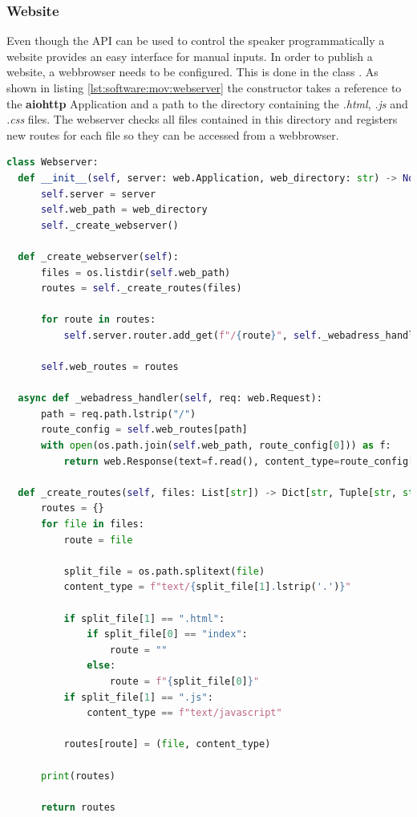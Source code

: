 \subsubsection*{Website}

Even though the API can be used to control the speaker programmatically a website provides an easy interface for manual inputs.\p
%
In order to publish a website,  a webbrowser needs to be configured. This is done in the class . As shown in listing \ref{lst:software:mov:webserver} the constructor takes a reference to the \textbf{aiohttp} Application and a path to the directory containing the \textit{.html}, \textit{.js} and \textit{.css} files. The webserver checks all files contained in this directory and registers new routes for each file so they can be accessed from a webbrowser.\p
%
\begin{mdframed}
\begin{lstlisting}[language=Python, caption=Minimal python webserver, label=lst:software:mov:webserver]
class Webserver:
  def __init__(self, server: web.Application, web_directory: str) -> None:
      self.server = server
      self.web_path = web_directory
      self._create_webserver()

  def _create_webserver(self):
      files = os.listdir(self.web_path)
      routes = self._create_routes(files)

      for route in routes:
          self.server.router.add_get(f"/{route}", self._webadress_handler)

      self.web_routes = routes

  async def _webadress_handler(self, req: web.Request):
      path = req.path.lstrip("/")
      route_config = self.web_routes[path]
      with open(os.path.join(self.web_path, route_config[0])) as f:
          return web.Response(text=f.read(), content_type=route_config[1])

  def _create_routes(self, files: List[str]) -> Dict[str, Tuple[str, str]]:
      routes = {}
      for file in files:
          route = file

          split_file = os.path.splitext(file)
          content_type = f"text/{split_file[1].lstrip('.')}"

          if split_file[1] == ".html":
              if split_file[0] == "index":
                  route = ""
              else:
                  route = f"{split_file[0]}"
          if split_file[1] == ".js":
              content_type == f"text/javascript"

          routes[route] = (file, content_type)

      print(routes)

      return routes
\end{lstlisting}
\end{mdframed}
